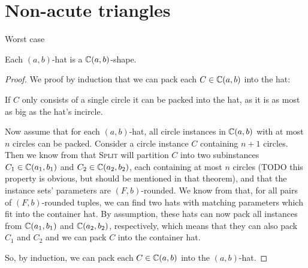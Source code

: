 \documentclass[a4paper,style=print,bibliography=totoc,nexus,lnum,extramargin]{tubsbook}
\begin{document}

\section{Non-acute triangles}

Worst case

\begin{theorem}\label{th:hats}
    Each $(a,b)$-hat is a $\mathbb{C}(a,b)$-shape.
\end{theorem}

\begin{proof}

    We proof by induction that we can pack each $C \in \mathbb{C}(a,b)$ into the hat:

    If $C$ only consists of a single circle it can be packed into the hat, as it is as most as big as the hat's incircle.

    Now assume that for each $(a,b)$-hat, all circle instances in $\mathbb{C}(a,b)$ with at most $n$ circles can be packed. Consider a circle instance $C$ containing $n+1$ circles. Then we know from  that \textsc{Split} will partition $C$ into two subinstances $C_1 \in \mathbb{C}(a_1, b_1)$ and $C_2 \in \mathbb{C}(a_2, b_2)$, each containing at most $n$ circles (TODO this property is obvious, but should be mentioned in that theorem), and that the instance sets' parameters are $(F,b)$-rounded. We know from  that, for all pairs of $(F,b)$-rounded tuples, we can find two hats with matching parameters which fit into the container hat. By assumption, these hats can now pack all instances from $\mathbb{C}(a_1, b_1)$ and $\mathbb{C}(a_2, b_2)$, respectively, which means that they can also pack $C_1$ and $C_2$ and we can pack $C$ into the container hat.

    So, by induction, we can pack each $C \in \mathbb{C}(a,b)$ into the $(a,b)$-hat.
\end{proof}

%
\end{document}
